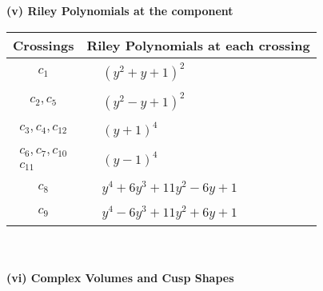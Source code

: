 \documentclass[1p]{elsarticle_modified}
\theoremstyle{definition}
\begin{document}
\newpage\renewcommand{\arraystretch}{1}
\flushleft \textbf{(v) Riley Polynomials at the component}\newline \\
\begin{tabular}{m{50pt}|m{274pt}}
Crossings & \hspace{64pt}Riley Polynomials at each crossing \\
\hline $$\begin{aligned}c_{1}\end{aligned}$$&$\begin{aligned}
&(y^2+y+1)^2
\end{aligned}$\\
\hline $$\begin{aligned}c_{2},c_{5}\end{aligned}$$&$\begin{aligned}
&(y^2- y+1)^2
\end{aligned}$\\
\hline $$\begin{aligned}c_{3},c_{4},c_{12}\end{aligned}$$&$\begin{aligned}
&(y+1)^4
\end{aligned}$\\
\hline $$\begin{aligned}c_{6},c_{7},c_{10}\\c_{11}\end{aligned}$$&$\begin{aligned}
&(y-1)^4
\end{aligned}$\\
\hline $$\begin{aligned}c_{8}\end{aligned}$$&$\begin{aligned}
&y^4+6 y^3+11 y^2-6 y+1
\end{aligned}$\\
\hline $$\begin{aligned}c_{9}\end{aligned}$$&$\begin{aligned}
&y^4-6 y^3+11 y^2+6 y+1
\end{aligned}$\\
\hline
\end{tabular}\\~\\
\newpage\flushleft \textbf{(vi) Complex Volumes and Cusp Shapes}
\end{document}
